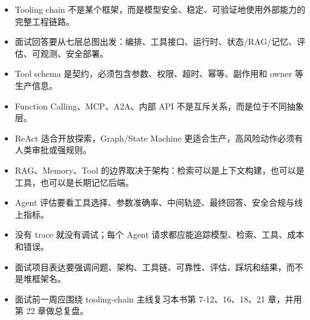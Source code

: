 \begin{itemize}[leftmargin=2em]
\item Tooling chain 不是某个框架，而是模型安全、稳定、可验证地使用外部能力的完整工程链路。
\item 面试回答要从七层总图出发：编排、工具接口、运行时、状态/RAG/记忆、评估、可观测、安全部署。
\item Tool schema 是契约，必须包含参数、权限、超时、幂等、副作用和 owner 等生产信息。
\item Function Calling、MCP、A2A、内部 API 不是互斥关系，而是位于不同抽象层。
\item ReAct 适合开放探索，Graph/State Machine 更适合生产，高风险动作必须有人类审批或强规则。
\item RAG、Memory、Tool 的边界取决于架构：检索可以是上下文构建，也可以是工具，也可以是长期记忆后端。
\item Agent 评估要看工具选择、参数准确率、中间轨迹、最终回答、安全合规与线上指标。
\item 没有 trace 就没有调试；每个 Agent 请求都应能追踪模型、检索、工具、成本和错误。
\item 面试项目表达要强调问题、架构、工具链、可靠性、评估、踩坑和结果，而不是堆框架名。
\item 面试前一周应围绕 tooling-chain 主线复习本书第 7-12、16、18、21 章，并用第 22 章做总复盘。
\end{itemize}
